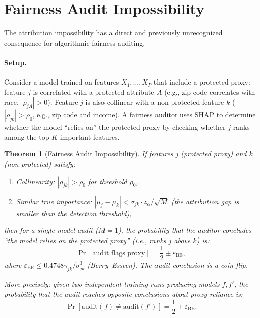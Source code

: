 \documentclass{article}
\newtheorem{theorem}{Theorem}
\begin{document}
\section{Fairness Audit Impossibility}

The attribution impossibility has a direct and previously unrecognized
consequence for algorithmic fairness auditing.

\paragraph{Setup.}
Consider a model trained on features $X_1, \ldots, X_P$ that include
a protected proxy: feature $j$ is correlated with a protected attribute
$A$ (e.g., zip code correlates with race, $|\rho_{jA}| > 0$).
Feature $j$ is also collinear with a non-protected feature $k$
($|\rho_{jk}| > \rho_0$, e.g., zip code and income). A fairness
auditor uses SHAP to determine whether the model ``relies on'' the
protected proxy by checking whether $j$ ranks among the top-$K$
important features.

\begin{theorem}[Fairness Audit Impossibility]
\label{thm:fairness-audit}
If features $j$ (protected proxy) and $k$ (non-protected) satisfy:
\begin{enumerate}
    \item[(F1)] Collinearity: $|\rho_{jk}| > \rho_0$ for
      threshold $\rho_0$,
    \item[(F2)] Similar true importance:
      $|\mu_j - \mu_k| < \sigma_{jk} \cdot z_\alpha / \sqrt{M}$
      (the attribution gap is smaller than the detection threshold),
\end{enumerate}
then for a single-model audit ($M{=}1$), the probability that the
auditor concludes ``the model relies on the protected proxy'' (i.e.,
ranks $j$ above $k$) is:
\[
    \Pr[\text{audit flags proxy}] = \frac{1}{2}
    \pm \varepsilon_{\text{BE}},
\]
where $\varepsilon_{\text{BE}} \leq 0.4748\gamma_{jk}/\sigma_{jk}^3$
(Berry--Esseen). The audit conclusion is a coin flip.

More precisely: given two independent training runs producing
models $f, f'$, the probability that the audit reaches
\emph{opposite conclusions} about proxy reliance is:
\[
    \Pr[\text{audit}(f) \neq \text{audit}(f')] = \frac{1}{2}
    \pm \varepsilon_{\text{BE}}.
\]
\end{theorem}
\end{document}
